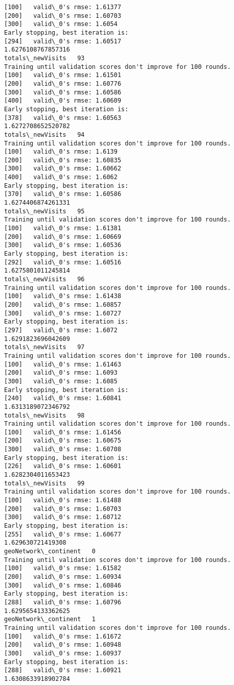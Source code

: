 \documentclass[11pt]{article}
\begin{document}
\begin{Verbatim}[commandchars=\\\{\}]
[100]	valid\_0's rmse: 1.61377
[200]	valid\_0's rmse: 1.60703
[300]	valid\_0's rmse: 1.6054
Early stopping, best iteration is:
[294]	valid\_0's rmse: 1.60517
1.6276108767857316
totals\_newVisits   93
Training until validation scores don't improve for 100 rounds.
[100]	valid\_0's rmse: 1.61501
[200]	valid\_0's rmse: 1.60776
[300]	valid\_0's rmse: 1.60586
[400]	valid\_0's rmse: 1.60609
Early stopping, best iteration is:
[378]	valid\_0's rmse: 1.60563
1.6272708652520782
totals\_newVisits   94
Training until validation scores don't improve for 100 rounds.
[100]	valid\_0's rmse: 1.6139
[200]	valid\_0's rmse: 1.60835
[300]	valid\_0's rmse: 1.60662
[400]	valid\_0's rmse: 1.6062
Early stopping, best iteration is:
[370]	valid\_0's rmse: 1.60586
1.6274406874261331
totals\_newVisits   95
Training until validation scores don't improve for 100 rounds.
[100]	valid\_0's rmse: 1.61381
[200]	valid\_0's rmse: 1.60669
[300]	valid\_0's rmse: 1.60536
Early stopping, best iteration is:
[292]	valid\_0's rmse: 1.60516
1.6275801011245814
totals\_newVisits   96
Training until validation scores don't improve for 100 rounds.
[100]	valid\_0's rmse: 1.61438
[200]	valid\_0's rmse: 1.60857
[300]	valid\_0's rmse: 1.60727
Early stopping, best iteration is:
[297]	valid\_0's rmse: 1.6072
1.6291823696042609
totals\_newVisits   97
Training until validation scores don't improve for 100 rounds.
[100]	valid\_0's rmse: 1.61463
[200]	valid\_0's rmse: 1.6093
[300]	valid\_0's rmse: 1.6085
Early stopping, best iteration is:
[240]	valid\_0's rmse: 1.60841
1.6313189072346792
totals\_newVisits   98
Training until validation scores don't improve for 100 rounds.
[100]	valid\_0's rmse: 1.61456
[200]	valid\_0's rmse: 1.60675
[300]	valid\_0's rmse: 1.60708
Early stopping, best iteration is:
[226]	valid\_0's rmse: 1.60601
1.6282304011653423
totals\_newVisits   99
Training until validation scores don't improve for 100 rounds.
[100]	valid\_0's rmse: 1.61488
[200]	valid\_0's rmse: 1.60703
[300]	valid\_0's rmse: 1.60712
Early stopping, best iteration is:
[255]	valid\_0's rmse: 1.60677
1.629630721419308
geoNetwork\_continent   0
Training until validation scores don't improve for 100 rounds.
[100]	valid\_0's rmse: 1.61582
[200]	valid\_0's rmse: 1.60934
[300]	valid\_0's rmse: 1.60846
Early stopping, best iteration is:
[288]	valid\_0's rmse: 1.60796
1.6295654133362625
geoNetwork\_continent   1
Training until validation scores don't improve for 100 rounds.
[100]	valid\_0's rmse: 1.61672
[200]	valid\_0's rmse: 1.60948
[300]	valid\_0's rmse: 1.60937
Early stopping, best iteration is:
[288]	valid\_0's rmse: 1.60921
1.6308633918902784

\end{Verbatim}
\end{document}
